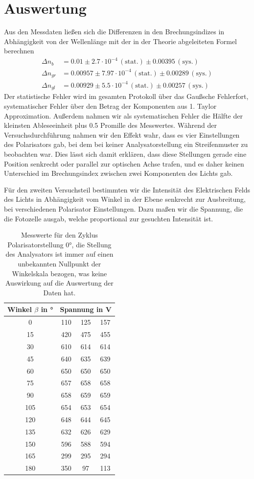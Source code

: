\documentclass[a4paper, 12pt,]{scrartcl}
\begin{document}
\section{Auswertung}
Aus den Messdaten ließen sich die Differenzen in den Brechungsindizes in Abhängigkeit von der Wellenlänge mit der in der Theorie abgeleiteten Formel berechnen
\begin{align*}\Delta{n_b}&=0.01\pm2.7\cdot10^{-4}\,(\text{stat.})\pm0.00395\,(\text{sys.})\\
\Delta{n_{gr}}&=0.00957\pm7.97\cdot10^{-4}\,(\text{stat.})\pm0.00289\,(\text{sys.})\\
\Delta{n_{gl}}&=0.00929\pm5.5\cdot10^{-4}\,(\text{stat.})\pm0.00257\,(\text{sys.})\end{align*}
Der statistische Fehler wird im gesamten Protokoll über das Gaußsche Fehlerfort, systematischer Fehler über den Betrag der Komponenten aus 1. Taylor Approximation. Außerdem nahmen wir als systematischen Fehler die Hälfte der kleinsten Ableseeinheit plus 0.5 Promille des Messwertes.\newline
Während der Versuchsdurchführung nahmen wir den Effekt wahr, dass es vier Einstellungen des Polarisators gab, bei dem bei keiner Analysatorstellung ein Streifenmuster zu beobachten war. Dies lässt sich damit erklären, dass diese Stellungen gerade eine Position senkrecht oder parallel zur optischen Achse trafen, und es daher keinen Unterschied im Brechungsindex zwischen zwei Komponenten des Lichts gab.\newline\newline

Für den zweiten Versuchsteil bestimmten wir die Intensität des Elektrischen Felds des Lichts in Abhängigkeit vom Winkel in der Ebene senkrecht zur Ausbreitung, bei verschiedenen Polarisator Einstellungen. Dazu maßen wir die Spannung, die die Fotozelle ausgab, welche proportional zur gesuchten Intensität ist.

\begin{table}[H]\centering\begin{tabular}{c |ccc}Winkel $\beta$ in °&\multicolumn{3}{c}{Spannung in V}\\\hline
0	&110	&125	&157\\
15&	420	&475	&455\\
30	&610	&614	&614\\
45&	640	&635	&639\\
60	&650	&650	&650\\
75	&657	&658	&658\\
90	&658	&659	&659\\
105	&654	&653	&654\\
120	&648	&644	&645\\
135	&632	&626	&629\\
150	&596	&588	&594\\
165	&299	&295&	294\\
180	&350&	97&	113\end{tabular}\caption{Messwerte für den Zyklus Polarisatorstellung 0°, die Stellung des Analysators ist immer auf einen unbekannten Nullpunkt der Winkelskala bezogen, was keine Auswirkung auf die Auswertung der Daten hat.}\end{table}
\end{document}
